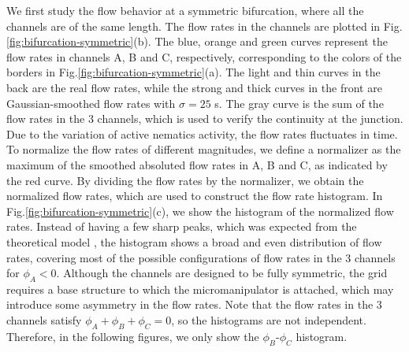 \documentclass[%
10pt,
superscriptaddress,
twocolumn,
 amsmath,amssymb,
 aps,prx,
]{revtex4-2}
\begin{document}
We first study the flow behavior at a symmetric bifurcation, where all the channels are of the same length.
The flow rates in the channels are plotted in Fig.\ref{fig:bifurcation-symmetric}(b).
The blue, orange and green curves represent the flow rates in channels A, B and C, respectively, corresponding to the colors of the borders in Fig.\ref{fig:bifurcation-symmetric}(a).
The light and thin curves in the back are the real flow rates, while the strong and thick curves in the front are Gaussian-smoothed flow rates with $\sigma=25$ s.
The gray curve is the sum of the flow rates in the 3 channels, which is used to verify the continuity at the junction.
Due to the variation of active nematics activity, the flow rates fluctuates in time. 
To normalize the flow rates of different magnitudes, we define a normalizer as the maximum of the smoothed absoluted flow rates in A, B and C, as indicated by the red curve. 
By dividing the flow rates by the normalizer, we obtain the normalized flow rates, which are used to construct the flow rate histogram.
In Fig.\ref{fig:bifurcation-symmetric}(c), we show the histogram of the normalized flow rates.
Instead of having a few sharp peaks, which was expected from the theoretical model \cite{Woodhouse2017}, the histogram shows a broad and even distribution of flow rates, covering most of the possible configurations of flow rates in the 3 channels for $\phi_A<0$.
Although the channels are designed to be fully symmetric, the grid requires a base structure to which the micromanipulator is attached, which may introduce some asymmetry in the flow rates.
Note that the flow rates in the 3 channels satisfy $\phi_A+\phi_B+\phi_C = 0$, so the histograms are not independent.
Therefore, in the following figures, we only show the $\phi_B$-$\phi_C$ histogram.
\end{document}
